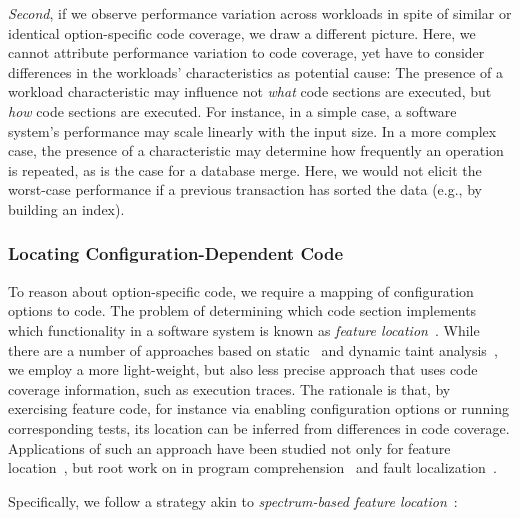 {{\textit{Second}, if we observe performance variation across workloads in spite of similar or identical option-specific code coverage, we draw a different picture. Here, we cannot attribute performance variation to code coverage, yet have to consider differences in the workloads’ characteristics as potential cause: The presence of a workload characteristic may influence not  \emph{what} code sections are executed, but \emph{how} code sections are executed. For instance, in a simple case, a software system’s performance may scale linearly with the input size. In a more complex case, the presence of a characteristic may determine how frequently an operation is repeated, as is the case for a database merge. Here, we would not elicit the worst-case performance if a previous transaction has sorted the data (e.g., by building an index).

\subsubsection{Locating Configuration-Dependent Code}
To reason about option-specific code, we require a mapping of configuration options to code. 
The problem of determining which code section implements which functionality in a software system is known as \emph{feature location}~\cite{rubin_feature_2013}. 
While there are a number of approaches based on static~\cite{velez_2020_configcrusher_jase,lillack_2018_lotrack_tse,luo_2019_cova} and dynamic taint analysis~\cite{bell_phosphor_2014,velez_comprex_2021,splat_kim_2013}, we employ a more light-weight,  but also less precise approach that uses code coverage information, such as execution traces.
The rationale is that, by exercising feature code, for instance via enabling configuration options or running corresponding tests, its location can be inferred from differences in code coverage. 
Applications of such an approach have been studied not only for feature location~\cite{wong_integrated_2005,sulir_annotation_2015,michelon_spectrum_2021,perez_framing_2016}, but root work on in program comprehension~\cite{wilde_early_1996,wilde_reconnaissance_1995,sherwood_reducing_nodate,perez_diagnosis_2014,castro_pangolin_2019} and fault localization~\cite{agrawal_fault_1995,wong_faultloc_2016}. 
}
Specifically, we follow  a strategy akin to  \textit{spectrum-based feature location}~\cite{michelon_spectrum_2021}:

}
